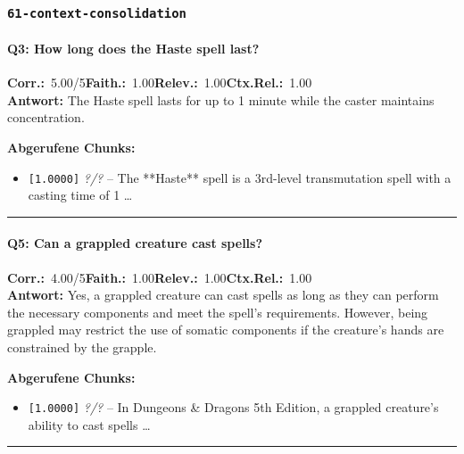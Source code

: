 \subsubsection*{\texttt{61-context-consolidation}}
\label{app:samples:61_context_consolidation}

\paragraph{Q3: How long does the Haste spell last?}
\noindent \textbf{Corr.:}~5.00/5\quad \textbf{Faith.:}~1.00\quad \textbf{Relev.:}~1.00\quad \textbf{Ctx.Rel.:}~1.00\\

\noindent\textbf{Antwort:} The Haste spell lasts for up to 1 minute while the caster maintains concentration.

\noindent\textbf{Abgerufene Chunks:}
\begin{itemize}[noitemsep, topsep=2pt]
  \item[\textbf{\#1}] \texttt{[1.0000]} \textit{?/?} -- The **Haste** spell is a 3rd-level transmutation spell with a casting time of 1 \ldots
\end{itemize}
\vspace{4pt}
\hrule
\vspace{6pt}

\paragraph{Q5: Can a grappled creature cast spells?}
\noindent \textbf{Corr.:}~4.00/5\quad \textbf{Faith.:}~1.00\quad \textbf{Relev.:}~1.00\quad \textbf{Ctx.Rel.:}~1.00\\

\noindent\textbf{Antwort:} Yes, a grappled creature can cast spells as long as they can perform the necessary components and meet the spell's requirements. However, being grappled may restrict the use of somatic components if the creature's hands are constrained by the grapple.

\noindent\textbf{Abgerufene Chunks:}
\begin{itemize}[noitemsep, topsep=2pt]
  \item[\textbf{\#1}] \texttt{[1.0000]} \textit{?/?} -- In Dungeons \& Dragons 5th Edition, a grappled creature's ability to cast spells \ldots
\end{itemize}
\vspace{4pt}
\hrule
\vspace{6pt}


